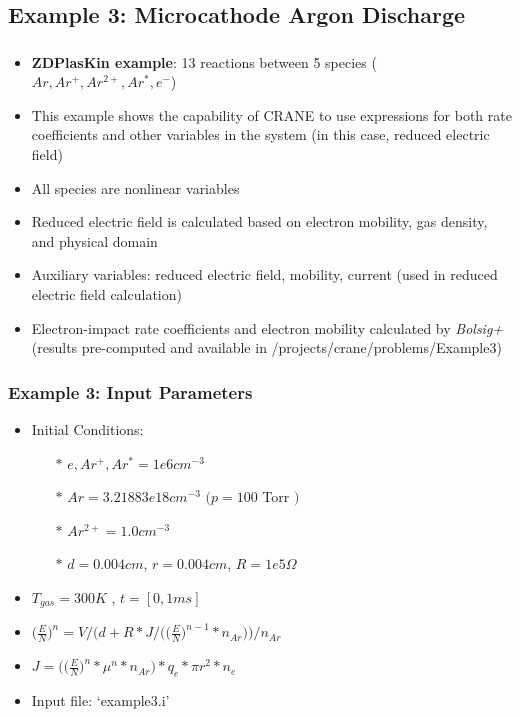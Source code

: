 \subsection{Example 3: Microcathode Argon Discharge} 
\begin{frame}[fragile]
	\frametitle{\insertsubsectionhead}
	\begin{itemize}
		\item \textbf{ZDPlasKin example}\footnotemark: 13 reactions between 5 species ($Ar, Ar^+, Ar^{2+}, Ar^*, e^-$) 
		\item This example shows the capability of CRANE to use expressions for both rate coefficients and other variables in the system (in this case, reduced electric field)
		\item All species are nonlinear variables
		\item Reduced electric field is calculated based on electron mobility, gas density, and physical domain
		\item Auxiliary variables: reduced electric field, mobility, current (used in reduced electric field calculation)
		\item Electron-impact rate coefficients and electron mobility calculated by \textit{Bolsig+} (results pre-computed and available in /projects/crane/problems/Example3)
	\end{itemize}
\end{frame}




\begin{frame}[fragile]
	\frametitle{Example 3: Input Parameters}
	\begin{itemize}
		\item Initial Conditions:
		\begin{itemize}
			\item[$\ast$] $e, Ar^+, Ar^*= 1e6 cm^{-3}$
			\item[$\ast$]  $Ar = 3.21883e18 cm^{-3}$ $(p = 100$ Torr $)$
			\item[$\ast$]  $Ar^{2+} = 1.0 cm^{-3}$
			\item[$\ast$] $d = 0.004 cm$, $r = 0.004 cm$, $R = 1e5 \Omega$
		\end{itemize}
		\item $T_{gas} = 300 K$ , $t=[0,1 ms]$
		\item $\Big(\tfrac{E}{N}\Big)^n = V / \Big(d + R*J/\Big(\Big(\tfrac{E}{N}\Big)^{n-1}*n_{Ar}\Big)\Big)/n_{Ar}$
		\item $J = \Big(\Big(\tfrac{E}{N}\Big)^n * \mu^n * n_{Ar}\Big) * q_e * \pi r^2 * n_e$
		\item Input file: `example3.i'
	\end{itemize}
\end{frame}

